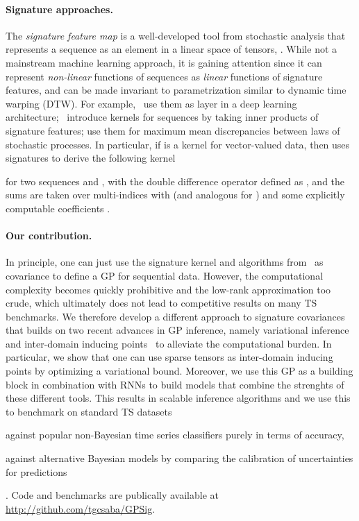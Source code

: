 \documentclass{article}
\begin{document}
  \paragraph{Signature approaches.}
  The \textit{signature feature map} is a well-developed tool from stochastic analysis that represents a sequence as an element in a linear space of tensors, \cite{chen-58, Lyons2007Differential}.
  While not a mainstream machine learning approach, it is gaining attention since it can represent \emph{non-linear} functions of sequences as \emph{linear} functions of signature features, and can be made invariant to parametrization similar to dynamic time warping (DTW).
  For example,~\cite{Kidger2019DeepSig} use them as layer in a deep learning architecture;~\cite{KiralyOberhauser2019KSig} introduce kernels for sequences by taking inner products of signature features;
  \cite{ChevyrevOberhauser18} use them for maximum mean discrepancies between laws of stochastic processes. In particular, if  is a kernel for vector-valued data, then \cite{KiralyOberhauser2019KSig} uses signatures to derive the following kernel
  
  for two sequences  and , with the double difference operator defined as , and the sums are taken over multi-indices  with  (and analogous for ) and some explicitly computable coefficients .

	\paragraph{Our contribution.}
  In principle, one can just use the signature kernel and algorithms from~\cite{KiralyOberhauser2019KSig} as covariance to define a GP for sequential data. 
  However, the computational complexity becomes quickly prohibitive and the low-rank approximation too crude, which ultimately does not lead to competitive results on many TS benchmarks.
  We therefore develop a different approach to signature covariances that builds on two recent advances in GP inference, namely variational inference \cite{Titsias2009Variational, Hensman2015Scalable, matthews2016sparse} and inter-domain inducing points~\cite{lazaro2009inter} to alleviate the computational burden.
  In particular, we show that one can use sparse tensors as inter-domain inducing points by optimizing a variational bound.
  Moreover, we use this GP as a building block in combination with RNNs to build models that combine the strenghts of these different tools. 
  This results in scalable inference algorithms and we use this to benchmark on standard TS datasets \begin{enumerate*}[label=(\roman*)] \item against popular non-Bayesian time series classifiers purely in terms of accuracy, \item against alternative Bayesian models by comparing the calibration of uncertainties for predictions \end{enumerate*}.
    Code and benchmarks are publically available at \url{http://github.com/tgcsaba/GPSig}.
	
\end{document}
